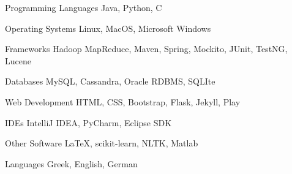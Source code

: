 

\begin{cvskills}

  \cvskill
    {Programming Languages} %
    {Java, Python, C} %

  \cvskill
    {Operating Systems} %
    {Linux, MacOS, Microsoft Windows} %
    
  \cvskill
    {Frameworks} %
    {Hadoop MapReduce, Maven, Spring, Mockito, JUnit, TestNG, Lucene} %

  \cvskill
    {Databases} %
    {MySQL, Cassandra, Oracle RDBMS, SQLIte} %

  \cvskill
    {Web Development} %
    {HTML, CSS, Bootstrap, Flask, Jekyll, Play} %

  \cvskill
    {IDEs} %
    {IntelliJ IDEA, PyCharm, Eclipse SDK} %

  \cvskill
    {Other Software} %
    {LaTeX, scikit-learn, NLTK, Matlab} %

  \cvskill
    {Languages} %
    {Greek, English, German} %

\end{cvskills}

